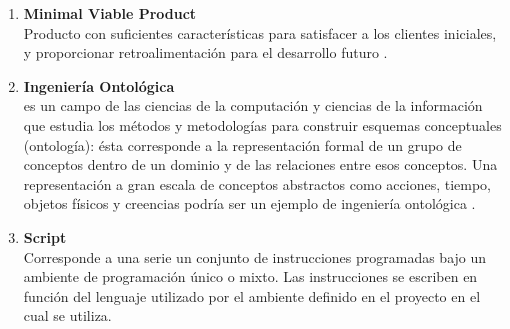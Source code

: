 \begin{enumerate}
  \item \label{mvp} \textbf{Minimal Viable Product} \mbox{} \\ Producto con suficientes características para satisfacer a los clientes iniciales, y proporcionar retroalimentación para el desarrollo futuro \cite{mvp}.
  \item \label{ontoligical} \textbf{Ingeniería Ontológica} \mbox{} \\ es un campo de las ciencias de la computación y ciencias de la información que estudia los métodos y metodologías para construir esquemas conceptuales (ontología): ésta corresponde a la representación formal de un grupo de conceptos dentro de un dominio y de las relaciones entre esos conceptos. Una representación a gran escala de conceptos abstractos como acciones, tiempo, objetos físicos y creencias podría ser un ejemplo de ingeniería ontológica \cite{ontology_engineering}.
  \item \label{script} \textbf{Script} \mbox{} \\ Corresponde a una serie un conjunto de instrucciones programadas bajo un ambiente de programación único o mixto. Las instrucciones se escriben en función del lenguaje utilizado por el ambiente definido en el proyecto en el cual se utiliza.
\end{enumerate}
